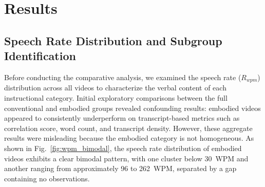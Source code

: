 \section{Results}
\datatable
{}\ytdatatable

\subsection{Speech Rate Distribution and Subgroup Identification}

Before conducting the comparative analysis, we examined the speech rate ($R_{wpm}$) distribution across all videos to characterize the verbal content of each instructional category. Initial exploratory comparisons between the full conventional and embodied groups revealed confounding results: embodied videos appeared to consistently underperform on transcript-based metrics such as correlation score, word count, and transcript density. However, these aggregate results were misleading because the embodied category is not homogeneous. As shown in Fig.~\ref{fig:wpm_bimodal}, the speech rate distribution of embodied videos exhibits a clear bimodal pattern, with one cluster below 30~WPM and another ranging from approximately 96 to 262~WPM, separated by a gap containing no observations.

